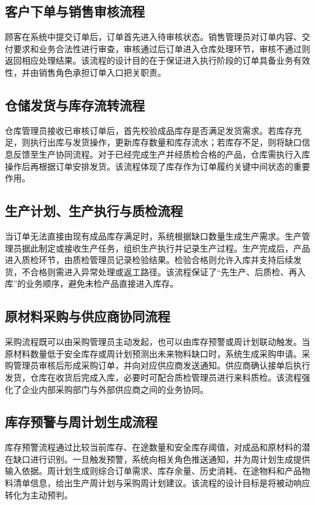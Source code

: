 \subsection{客户下单与销售审核流程}

顾客在系统中提交订单后，订单首先进入待审核状态。销售管理员对订单内容、交付要求和业务合法性进行审查，审核通过后订单进入仓库处理环节，审核不通过则返回相应处理结果。该流程的设计目的在于保证进入执行阶段的订单具备业务有效性，并由销售角色承担订单入口把关职责。

\subsection{仓储发货与库存流转流程}

仓库管理员接收已审核订单后，首先校验成品库存是否满足发货需求。若库存充足，则执行出库与发货操作，更新库存数量和库存流水；若库存不足，则将缺口信息反馈至生产协同流程。对于已经完成生产并经质检合格的产品，仓库需执行入库操作后再根据订单安排发货。该流程体现了库存作为订单履约关键中间状态的重要作用。

\subsection{生产计划、生产执行与质检流程}

当订单无法直接由现有成品库存满足时，系统根据缺口数量生成生产需求。生产管理员据此制定或接收生产任务，组织生产执行并记录生产过程。生产完成后，产品进入质检环节，由质检管理员记录检验结果。检验合格则允许入库并支持后续发货，不合格则需进入异常处理或返工路径。该流程保证了“先生产、后质检、再入库”的业务顺序，避免未检产品直接进入库存。

\subsection{原材料采购与供应商协同流程}

采购流程既可以由采购管理员主动发起，也可以由库存预警或周计划联动触发。当原材料数量低于安全库存或周计划预测出未来物料缺口时，系统生成采购申请。采购管理员审核后形成采购订单，并向对应供应商发送通知。供应商确认接单后执行发货，仓库在收货后完成入库，必要时可配合质检管理员进行来料质检。该流程强化了企业内部采购部门与外部供应商之间的业务协同。

\subsection{库存预警与周计划生成流程}

库存预警流程通过比较当前库存、在途数量和安全库存阈值，对成品和原材料的潜在缺口进行识别。一旦触发预警，系统向相关角色推送通知，并为周计划生成提供输入依据。周计划生成则综合订单需求、库存余量、历史消耗、在途物料和产品物料清单信息，给出生产周计划与采购周计划建议。该流程的设计目标是将被动响应转化为主动预判。

